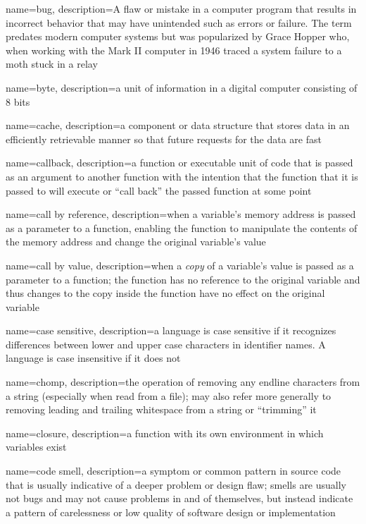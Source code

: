 {
  name=bug,
  description={A flaw or mistake in a computer program that results in incorrect behavior that may have unintended such as errors or failure.  The
  	term predates modern computer systems but was popularized by Grace Hopper who, when working with the Mark II computer in 1946 traced
  	a system failure to a moth stuck in a relay}
}

{
  name=byte,
  description={a unit of information in a digital computer consisting of 8 bits}
}

{
  name=cache,
  description={a component or data structure that stores data in an efficiently retrievable manner so that future requests for the data are fast}
}

{
  name=callback,
  description={a function or executable unit of code that is passed as an argument to another function with the intention that the function that it is passed to will execute or ``call back'' the passed function at some point}
}

{
  name=call by reference,
  description={when a variable's memory address is passed as a parameter to a function, enabling the function to manipulate the contents of the memory address and change the original variable's value}
}

{
  name=call by value,
  description={when a \emph{copy} of a variable's value is passed as a parameter to a function; the function has no reference to the original variable and thus changes to the copy inside the function have no effect on the original variable}
}

{
  name=case sensitive,
  description={a language is case sensitive if it recognizes differences between lower and upper case characters in 
  	identifier names.  A language is case insensitive if it does not}
}

{
  name=chomp,
  description={the operation of removing any endline characters from a string (especially when read from a file); may also refer more generally to removing leading and trailing whitespace from a string or ``trimming'' it}
}

{
  name=closure,
  description={a function with its own environment in which variables exist}
}

{
  name=code smell,
  description={a symptom or common pattern in source code that is usually indicative of a deeper problem or design flaw; smells are usually not bugs and may not cause problems in and of themselves, but instead indicate a pattern of carelessness or low quality of software design or implementation}
}

